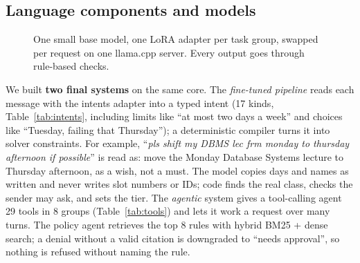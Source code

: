 \documentclass[10pt,a4paper]{article}
\begin{document}
\subsection{Language components and models}
\begin{figure}[!t]
\centering
{}
\caption{One small base model, one LoRA adapter per task group, swapped per request on one
llama.cpp server. Every output goes through rule-based checks.}
\label{fig:models}
\end{figure}

We built \textbf{two final systems} on the same core. The \emph{fine-tuned
pipeline} reads each message with the intents adapter into a typed intent
(17 kinds, Table~\ref{tab:intents}, including limits like ``at most two days a week'' and choices like
``Tuesday, failing that Thursday''); a deterministic compiler turns it into
solver constraints. For example, ``\emph{pls shift my DBMS lec frm monday to thursday
afternoon if possible}'' is read as: move the Monday Database Systems lecture to Thursday
afternoon, as a wish, not a must. The model copies days and names as written and never
writes slot numbers or IDs; code finds the real class, checks the sender may ask, and
sets the tier. The \emph{agentic} system gives a tool-calling agent 29
tools in 8 groups (Table~\ref{tab:tools}) and lets it work a request over many turns. The policy agent retrieves
the top 8 rules with hybrid BM25 + dense search; a denial without a valid
citation is downgraded to ``needs approval'', so nothing is refused without
naming the rule.
\end{document}
